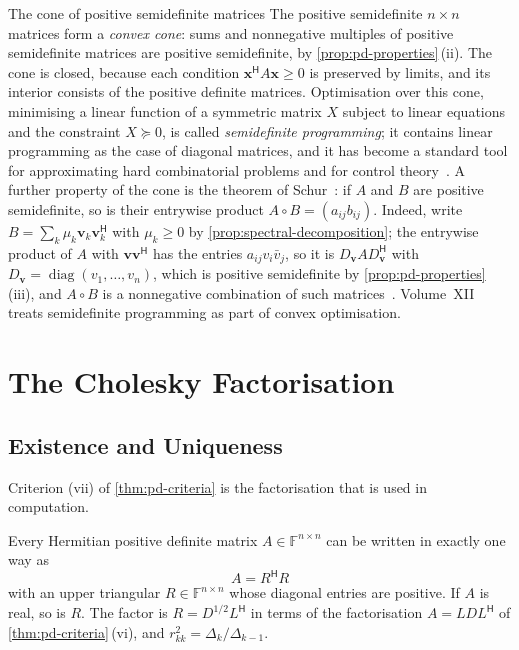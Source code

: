 \begin{note}{The cone of positive semidefinite matrices}
The positive semidefinite $n\times n$ matrices form a \emph{convex cone}: sums and nonnegative multiples of positive semidefinite matrices are positive semidefinite, by \cref{prop:pd-properties}\,(ii). The cone is closed, because each condition $\mathbf x^{\mathsf H}A\mathbf x\ge0$ is preserved by limits, and its interior consists of the positive definite matrices. Optimisation over this cone, minimising a linear function of a symmetric matrix $X$ subject to linear equations and the constraint $X\succeq0$, is called \emph{semidefinite programming}; it contains linear programming as the case of diagonal matrices, and it has become a standard tool for approximating hard combinatorial problems and for control theory~\cite{vandenberghe1996}. A further property of the cone is the theorem of Schur~\cite{schur1911}: if $A$ and $B$ are positive semidefinite, so is their entrywise product $A\circ B=(a_{ij}b_{ij})$. Indeed, write $B=\sum_k\mu_k\mathbf v_k\mathbf v_k^{\mathsf H}$ with $\mu_k\ge0$ by \cref{prop:spectral-decomposition}; the entrywise product of $A$ with $\mathbf v\mathbf v^{\mathsf H}$ has the entries $a_{ij}v_i\bar v_j$, so it is $D_{\mathbf v}AD_{\mathbf v}^{\mathsf H}$ with $D_{\mathbf v}=\operatorname{diag}(v_1,\ldots,v_n)$, which is positive semidefinite by \cref{prop:pd-properties}\,(iii), and $A\circ B$ is a nonnegative combination of such matrices~\cite[Sect.~7.5]{horn2013}. Volume~XII treats semidefinite programming as part of convex optimisation.
\end{note}

\section{The Cholesky Factorisation}
\label{sec:cholesky}

\subsection{Existence and Uniqueness}

Criterion (vii) of \cref{thm:pd-criteria} is the factorisation that is used in computation.

\begin{theorem}
\label{thm:cholesky}
Every Hermitian positive definite matrix $A\in\mathbb F^{n\times n}$ can be written in exactly one way as
\[
A=R^{\mathsf H}R
\]
with an upper triangular $R\in\mathbb F^{n\times n}$ whose diagonal entries are positive. If $A$ is real, so is $R$. The factor is $R=D^{1/2}L^{\mathsf H}$ in terms of the factorisation $A=LDL^{\mathsf H}$ of \cref{thm:pd-criteria}\,(vi), and $r_{kk}^2=\Delta_k/\Delta_{k-1}$.
\end{theorem}

